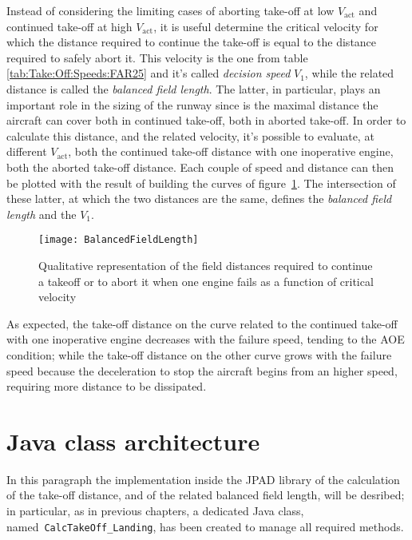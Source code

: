 \bigskip
\noindent
Instead of considering the limiting cases of aborting take-off at low $V_{\text{act}}$ and continued take-off at high $V_{\text{act}}$, it is useful determine the critical velocity for which the distance required to continue the take-off is equal to the distance required to safely abort it. This velocity is the one from table \ref{tab:Take:Off:Speeds:FAR25} and it's called \emph{decision speed} $V_1$, while the related distance is called the \emph{balanced field length}. The latter, in particular, plays an important role in the sizing of the runway since is the maximal distance the aircraft can cover both in continued take-off, both in 
aborted take-off. 
%
In order to calculate this distance, and the related velocity, it's possible to evaluate, at different $V_{\text{act}}$,  both the continued take-off distance with one inoperative engine, both the aborted take-off distance. Each couple of speed and distance can then be plotted with the result of building the curves of figure~\ref{fig:BalancedFieldLength}. The intersection of these latter, at which the two distances are the same, defines the \emph{balanced field length} and the $V_1$.
%
\begin{figure}[H]
\centering
\texttt{[image: BalancedFieldLength]}
\caption{Qualitative representation of the field distances required to continue a takeoff or to abort it when one
engine fails as a function of critical velocity}
\label{fig:BalancedFieldLength}
\end{figure}
%
\noindent
As expected, the take-off distance on the curve related to the continued take-off with one inoperative engine decreases with the failure speed, tending to the AOE condition; while the take-off distance on the other curve grows with the failure speed because the deceleration to stop the aircraft begins from an higher speed, requiring more distance to be dissipated.
%
\section{Java class architecture}
%
In this paragraph the implementation inside the \gls{JPAD} library of the calculation of the take-off distance, and of the related balanced field length, will be desribed; in particular, as in previous chapters, a dedicated Java class, named~\lstinline[language=Java]!CalcTakeOff_Landing!, has been created to manage all required methods.

